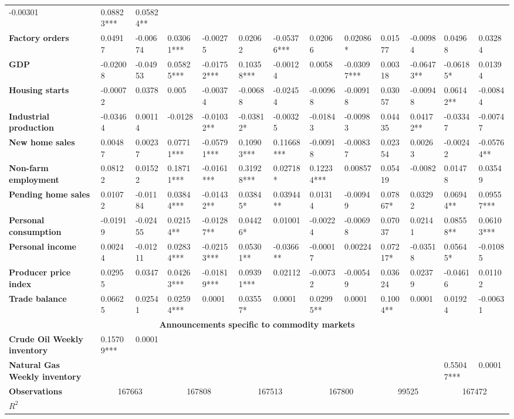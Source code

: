 \begin{sidewaystable}
{\begin{tabular}{@{}lllllllllllll@{}}
-0.00301 & 0.08823*** & 0.05824** \\ \textbf{Factory orders}& 0.04917 & -0.00674 & 0.03061*** & -0.00275 & 0.02062 & -0.05376*** & 0.02066 & 0.02086* & 0.01577 & -0.00984 & 0.04968 & 0.03284 \\ \textbf{GDP}& -0.02008 & -0.04953 & 0.05825*** & -0.01752*** & 0.10358*** & -0.00124 & 0.0058 & -0.03097*** & 0.00318 & -0.06473** & -0.06185* & 0.01394 \\ \textbf{Housing starts}& -0.00072 & 0.0378 & 0.005 & -0.00374 & -0.00688 & -0.02454 & -0.00968 & -0.00918 & 0.03057 & -0.00948 & 0.06142** & -0.00844 \\ \textbf{Industrial production}& -0.03464 & 0.00114 & -0.0128 & -0.01032** & -0.03812* & -0.00325 & -0.01843 & -0.00983 & 0.04435 & 0.04172** & -0.03347 & -0.00747 \\ \textbf{New home sales}& 0.00487 & 0.00237 & 0.07711*** & -0.05791***& 0.10903*** & 0.11668*** & -0.00918 & -0.00837 & 0.02354 & 0.00263 & -0.00242 & -0.05764** \\ \textbf{Non-farm employment}& 0.08122 & 0.01522 & 0.18711*** & -0.0161***& 0.31928*** & 0.02718* & 0.12234*** & 0.00857 & 0.05419 & -0.0082 & 0.01478 & 0.03549 \\ \textbf{Pending home sales}& 0.01072 & -0.01184 & 0.03844*** & -0.01432**& 0.03845* & 0.03944** & 0.01314 & -0.00949 & 0.07867* & 0.03292 & 0.06944** & 0.09557*** \\ \textbf{Personal consumption}& -0.01919 & -0.02455 & 0.02154** & -0.01287**& 0.04426* & 0.01001 & -0.00224 & -0.00698 & 0.07037 & 0.02141 & 0.08558** & 0.06103*** \\ \textbf{Personal income}& 0.00244 & -0.01211 & 0.02834*** & -0.02153*** & 0.05301** & -0.0366** & -0.00017 & 0.00224 & 0.07217* & -0.03518 & 0.05645* & -0.01085 \\ \textbf{Producer price index}& 0.02955 & 0.0347 & 0.04263*** & -0.01819***& 0.09391*** & 0.02112 & -0.00732 & -0.00549 & 0.03624 & 0.02379 & -0.04616 & 0.01102 \\ \textbf{Trade balance}& 0.06625 & 0.02541 & 0.02594*** & 0.0001& 0.03557* & 0.0001& 0.02995** & 0.0001& 0.1004** & 0.0001& 0.01924 & -0.00631 \\  \midrule \multicolumn{13}{c}{\textbf{Announcements specific to commodity markets}} \\ \midrule \textbf{Crude Oil Weekly inventory}& 0.15709*** & 0.0001&  &  &  &  &  &  &  &  &  &  \\ \textbf{Natural Gas Weekly inventory}&  &  &  &  &  &  &  &  &  &  & 0.55047*** & 0.0001\\  \midrule \textbf{Observations}             &\multicolumn{2}{c}{ 167663 }                                                 & \multicolumn{2}{c}{ 167808 }                                                 & \multicolumn{2}{c}{ 167513 }                                                 & \multicolumn{2}{c}{ 167800 }                                                 & \multicolumn{2}{c}{ 99525 }                                                   & \multicolumn{2}{c}{ 167472 }                                                 \\ \textbf{$R^2$}             
\end{tabular}}
\end{sidewaystable}
